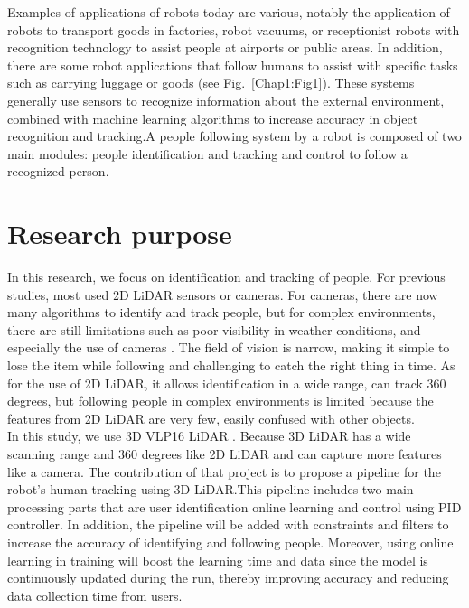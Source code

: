 Examples of applications of robots today are various, notably the application of robots to transport
goods in factories, robot vacuums, or receptionist robots with recognition
technology to assist people at airports or public areas. In addition, there are some robot applications
that follow humans to assist with specific tasks such as carrying luggage or goods (see Fig.~\ref{Chap1:Fig1}).
These systems generally use sensors to recognize information about the external environment, combined with machine learning algorithms to increase accuracy in object recognition and tracking\cite{chapter1-2}.A people following system by a robot is composed of two main modules: people identification and tracking and control to follow a recognized person.\\

\section{Research purpose}

In this research, we focus on identification and tracking of people. For previous studies, most used
2D LiDAR  sensors or cameras. For cameras, there are now many algorithms to identify and track people,
but for complex environments, there are still limitations such as poor visibility in weather conditions, and especially the use of cameras \cite{chapter1-3}. The field of vision is narrow, making it simple to lose the item while following and challenging to catch the right thing in time. %
As for the use of 2D LiDAR, it allows identification in a wide range, can track 360 degrees, but following people in complex environments is limited because the features from 2D LiDAR  are very few, easily confused with other objects.\\

In this study, we use 3D VLP16 LiDAR . Because 3D LiDAR  has a wide scanning range and 360 degrees
like 2D LiDAR  and can capture more features like a camera. The contribution of that project is to propose a pipeline
for the robot's human tracking using 3D LiDAR.This pipeline includes two main processing parts that are user
identification online learning and control using PID controller. In addition, the pipeline will be added with
constraints and filters to increase the accuracy of identifying and following people. Moreover, using online
learning in training will boost the learning time and data since the model is continuously  updated during the
run, thereby improving accuracy and reducing data collection time from users.\\

